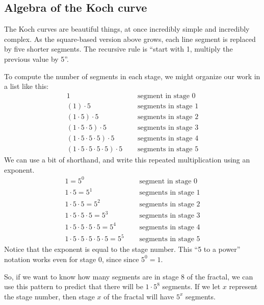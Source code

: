 \subsection{Algebra of the {K}och curve}

The Koch curves are beautiful things, at once incredibly simple and incredibly complex. As the square-based version above grows, each line segment is replaced by five shorter segments. The recursive rule is ``start with 1, multiply the previous value by 5''.

To compute the number of segments in each stage, we might organize our work in a list like this:
\[\begin{aligned}
1 & \quad\text{ segment in stage 0}
\\
(1) \cdot 5 & \quad\text{ segments in stage 1}
\\
(1 \cdot 5) \cdot 5 & \quad\text{ segments in stage 2}
\\
(1 \cdot 5 \cdot 5) \cdot 5 & \quad\text{ segments in stage 3}
\\
(1 \cdot 5 \cdot 5 \cdot 5) \cdot 5 & \quad\text{ segments in stage 4}
\\
(1 \cdot 5 \cdot 5 \cdot 5 \cdot 5) \cdot 5 & \quad\text{ segments in stage 5}
\end{aligned}\]
We can use a bit of shorthand, and write this repeated multiplication using an exponent.
\[\begin{aligned}
1 =5^0& \quad\text{ segment in stage 0}
\\
1 \cdot 5 =5^1& \quad\text{ segments in stage 1}
\\
1 \cdot 5 \cdot 5 =5^2& \quad\text{ segments in stage 2}
\\
1 \cdot 5 \cdot 5 \cdot 5 =5^3& \quad\text{ segments in stage 3}
\\
1 \cdot 5 \cdot 5 \cdot 5 \cdot 5 =5^4& \quad\text{ segments in stage 4}
\\
1 \cdot 5 \cdot 5 \cdot 5 \cdot 5 \cdot 5 =5^5& \quad\text{ segments in stage 5}
\end{aligned}\]
Notice that the exponent is equal to the stage number. This ``5 to a power'' notation works even for stage 0, since since $5^{0} = 1$.

So, if we want to know how many segments are in stage 8 of the fractal, we can use this pattern to predict that there will be $1\cdot 5^8$ segments. If we let $x$ represent the stage number, then stage $x$ of the fractal will have $5^x$ segments.

